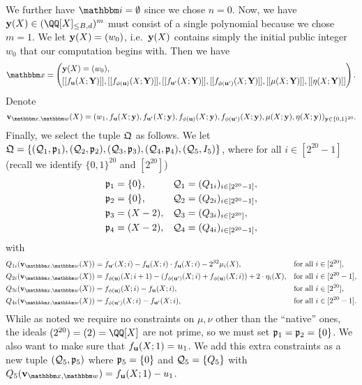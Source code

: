 \documentclass[11pt,letterpaper,usenames,dvipsnames]{article}
\begin{document}
We further have $\idx = \emptyset$ since we chose $n=0$. Now, we have $\yy(X) \in \mainQpolyring^m$ must consist of a single polynomial because we chose $m=1$. We let $\mathbf{y}(X) = (w_0)$, i.e.\ $\mathbf{y}(X)$ contains simply the initial public integer $w_0$ that our computation begins with. Then we have $$\inp = \left(\begin{aligned}&\yy(X)=(w_0),\\ &\oracle{f_{\uu}(X;\YY)}, \oracle{f_{\phi(\uu)}(X;\YY)}, \oracle{f_{\uu'}(X;\YY)}, \oracle{f_{\phi(\uu')}(X;\YY)}, \oracle{\mu(X;\YY)}, \oracle{\eta(X;\YY)}\end{aligned}\right).$$
%
Denote
%
$$
\vv_{\inp,\wit}(X)=(w_1, f_{\uu}(X;\yy), f_{\uu'}(X;\yy), f_{\phi(\uu)}(X;\yy), f_{\phi(\uu')}(X;\yy), \mu(X;\yy), \eta(X;\yy))_{\yy\in \{0,1\}^{20}}.
$$
Finally, we select the tuple $\mathfrak{Q}$ as follows. We let $\mathfrak{Q}=\{(\mathcal{Q}_1, \mathfrak{p}_1), (\mathcal{Q}_2, \mathfrak{p}_2), (\mathcal{Q}_3, \mathfrak{p}_3), (\mathcal{Q}_4, \mathfrak{p}_4), (\mathcal{Q}_5, I_5)\}$,
where for all $i\in [2^{20}-1]$ (recall we identify $\{0,1\}^{20}$ and $[2^{20}]$)
%
\begin{align*}
  &\mathfrak{p}_1 = \{0\}, &&\mathcal{Q}_1=(Q_{1i})_{i\in [2^{20}-1]},\\
  &\mathfrak{p}_2 = \{0\}, &&\mathcal{Q}_2=(Q_{2i})_{i\in [2^{20}-1]},\\
  &\mathfrak{p}_3 =(X-2), &&\mathcal{Q}_3=(Q_{3i})_{i\in [2^{20}]},\\
    &\mathfrak{p}_4 =(X-2), &&\mathcal{Q}_4=(Q_{4i})_{i\in [2^{20}-1]},
\end{align*}
with
\begin{align*}
  Q_{1i}(\vv_{\inp,\wit}(X))&=f_{\uu'}(X; i) - f_{\uu}(X;i)\cdot f_{\uu}(X;i) - 2^{32} \mu_i(X),&& \text{for all } i\in [2^{20}],\\
  Q_{2i}(\vv_{\inp,\wit}(X))&=f_{\phi(\uu)}(X; i+1) - (f_{\phi(\uu')}(X;i) + f_{\phi(\uu)}(X;i)) + 2\cdot \eta_i(X),&& \text{for all } i\in [2^{20}-1],\\
  Q_{3i}(\vv_{\inp,\wit}(X))&=f_{\phi(\uu)}(X;i)-f_{\uu}(X;i), && \text{for all } i\in [2^{20}],\\
  Q_{4i}(\vv_{\inp,\wit}(X))&=f_{\phi(\uu')}(X;i)-f_{\uu'}(X;i), && \text{for all } i\in [2^{20}-1].
\end{align*}
While as noted we require no constraints on $\mu,\nu$ other than the ``native'' ones, the ideals $(2^{20}) = (2) = \QQ[X]$ are not prime, so we must set $\primeideal_1 = \primeideal_2 = \set{0}$. We also want to make sure that $f_{\mathbf{u}}(X; 1)= u_1$. We add this extra constraints as a new tuple  $(\mathcal{Q}_5, \mathfrak{p}_5)$ where $\mathfrak{p}_5=\{0\}$ and $\mathcal{Q}_5=\{Q_5\}$ with $Q_5(\vv_{\inp,\wit})= f_{\uu}(X;1)-u_1$.
\end{document}
